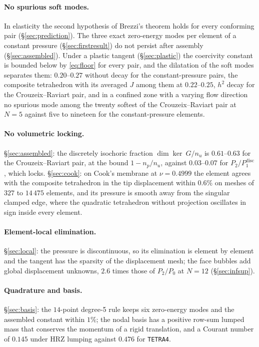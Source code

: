 \documentclass[11pt]{article}
\newcommand{\code}[1]{\texttt{#1}}
\theoremstyle{definition}
\theoremstyle{plain}
\begin{document}
\paragraph{No spurious soft modes.} In elasticity the second hypothesis of
Brezzi's theorem holds for every conforming pair (\S\ref{sec:prediction}). The
three exact zero-energy modes per element of a constant pressure
(\S\ref{sec:firstresult}) do not persist after assembly
(\S\ref{sec:assembled}). Under a plastic tangent (\S\ref{sec:plastic}) the
coercivity constant is bounded below by \eqref{eq:floor} for every pair, and
the dilatation of the soft modes separates them: $0.20$--$0.27$ without
decay for the constant-pressure pairs, the composite tetrahedron with its
averaged $J$ among them at $0.22$--$0.25$, $h^2$ decay for the
Crouzeix--Raviart pair, and in a confined zone with a varying flow direction
no spurious mode among the twenty softest of the Crouzeix--Raviart pair at
$N = 5$ against five to nineteen for the constant-pressure elements.

\paragraph{No volumetric locking.} \S\ref{sec:assembled}: the discretely
isochoric fraction $\dim\ker ~G / n_u$ is $0.61$--$0.63$ for the
Crouzeix--Raviart pair, at the bound $1 - n_p/n_u$, against
$0.03$--$0.07$ for $P_2/P_1^{\mathrm{disc}}$, which locks. \S\ref{sec:cook}:
on Cook's membrane at $\nu = 0.4999$ the element agrees with the composite
tetrahedron in the tip displacement within $0.6\%$ on meshes of $327$ to
$14\,475$ elements, and its pressure is smooth away from the singular
clamped edge, where the quadratic tetrahedron without projection oscillates
in sign inside every element.

\paragraph{Element-local elimination.} \S\ref{sec:local}: the pressure is
discontinuous, so its elimination is element by element and the tangent has
the sparsity of the displacement mesh; the face bubbles add global
displacement unknowns, $2.6$ times those of $P_2/P_0$ at $N = 12$
(\S\ref{sec:infsup}).

\paragraph{Quadrature and basis.} \S\ref{sec:basis}: the $14$-point degree-5
rule keeps six zero-energy modes and the assembled constant within $1\%$; the
nodal basis has a positive row-sum lumped mass that conserves the momentum
of a rigid translation, and a Courant number of $0.145$ under HRZ lumping
against $0.476$ for \code{TETRA4}.
\end{document}
